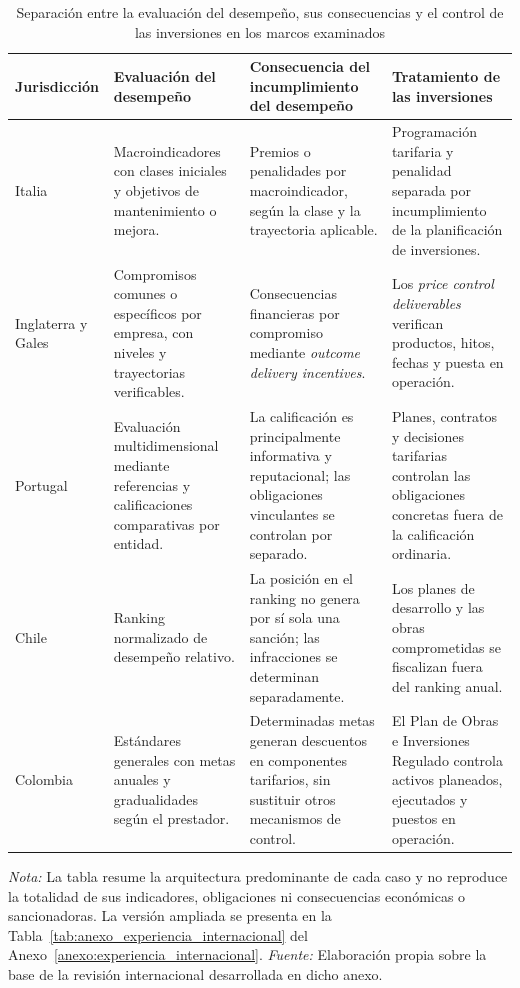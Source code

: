 \begin{table}[!t]
\centering
\caption{Separación entre la evaluación del desempeño, sus consecuencias y el control de las inversiones en los marcos examinados}
\label{tab:comparacion_internacional_separacion}
\scriptsize
\renewcommand{\arraystretch}{1.16}
\setlength{\tabcolsep}{3.8pt}
\begin{tabularx}{\textwidth}{
>{\raggedright\arraybackslash}p{1.65cm}
>{\raggedright\arraybackslash}p{3.45cm}
>{\raggedright\arraybackslash}X
>{\raggedright\arraybackslash}p{3.55cm}}
\hline
\textbf{Jurisdicción} &
\textbf{Evaluación del desempeño} &
\textbf{Consecuencia del incumplimiento del desempeño} &
\textbf{Tratamiento de las inversiones} \\
\hline
Italia &
Macroindicadores con clases iniciales y objetivos de mantenimiento o mejora. &
Premios o penalidades por macroindicador, según la clase y la trayectoria aplicable. &
Programación tarifaria y penalidad separada por incumplimiento de la planificación de inversiones. \\
Inglaterra y Gales &
Compromisos comunes o específicos por empresa, con niveles y trayectorias verificables. &
Consecuencias financieras por compromiso mediante \emph{outcome delivery incentives}. &
Los \emph{price control deliverables} verifican productos, hitos, fechas y puesta en operación. \\
Portugal &
Evaluación multidimensional mediante referencias y calificaciones comparativas por entidad. &
La calificación es principalmente informativa y reputacional; las obligaciones vinculantes se controlan por separado. &
Planes, contratos y decisiones tarifarias controlan las obligaciones concretas fuera de la calificación ordinaria. \\
Chile &
Ranking normalizado de desempeño relativo. &
La posición en el ranking no genera por sí sola una sanción; las infracciones se determinan separadamente. &
Los planes de desarrollo y las obras comprometidas se fiscalizan fuera del ranking anual. \\
Colombia &
Estándares generales con metas anuales y gradualidades según el prestador. &
Determinadas metas generan descuentos en componentes tarifarios, sin sustituir otros mecanismos de control. &
El Plan de Obras e Inversiones Regulado controla activos planeados, ejecutados y puestos en operación. \\
\hline
\end{tabularx}
\begin{minipage}{\textwidth}
\footnotesize
\textit{Nota:} La tabla resume la arquitectura predominante de cada caso y no reproduce la totalidad de sus indicadores, obligaciones ni consecuencias económicas o sancionadoras. La versión ampliada se presenta en la Tabla~\ref{tab:anexo_experiencia_internacional} del Anexo~\ref{anexo:experiencia_internacional}. \textit{Fuente:} Elaboración propia sobre la base de la revisión internacional desarrollada en dicho anexo.
\end{minipage}
\end{table}

